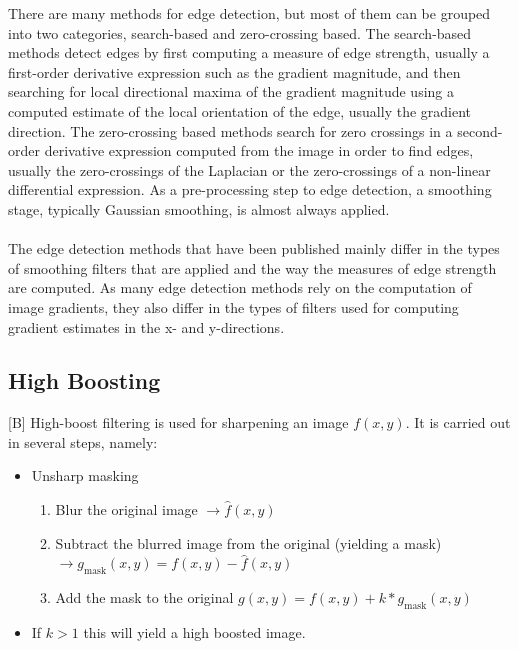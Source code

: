 \documentclass[12pt]{article}
\begin{document}
	\noindent [W]	There are many methods for edge detection, but most of them can be grouped into two categories, 
	search-based and zero-crossing based. The search-based methods detect edges by first computing a measure 
	of edge strength, usually a first-order derivative expression such as the gradient magnitude, and then 
	searching for local directional maxima of the gradient magnitude using a computed estimate of the local 
	orientation of the edge, usually the gradient direction. The zero-crossing based methods search for zero
	crossings in a second-order derivative expression computed from the image in order to find edges, usually 
	the zero-crossings of the Laplacian or the zero-crossings of a non-linear differential expression. As a
	pre-processing step to edge detection, a smoothing stage, typically Gaussian smoothing, is almost always applied.\\
	\\
    The edge detection methods that have been published mainly differ in the types of smoothing filters that are applied and the way the measures of edge        strength are computed. As many edge detection methods rely on the computation of image gradients, they also differ in the types of filters used for          computing gradient estimates in the x- and y-directions.
	
	\subsection{High Boosting}
	[B] High-boost filtering is used for sharpening an image $f(x,y)$. It is carried out in several steps, 
	namely:
	\begin{itemize}
	\item Unsharp masking \begin{enumerate}
	                        \item Blur the original image $\rightarrow \hat f(x,y)$
	                        \item Subtract the blurred image from the original 
	                        (yielding a mask) $ \rightarrow g_{\mathrm{mask}}(x,y) = f(x,y) - \hat f(x,y)$
	                        \item Add the mask to the original $ g(x,y) = f(x,y) + k * g_{\mathrm{mask}}(x,y)$
	                       \end{enumerate}
	\item If $ k > 1$ this will yield a high boosted image.
	\end{itemize}
%	
%	
\end{document}
